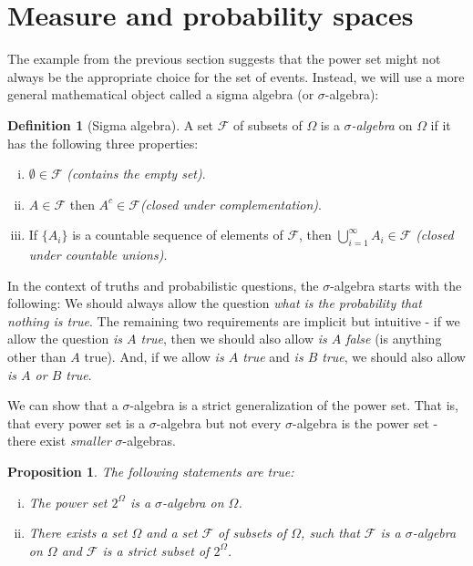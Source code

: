 \documentclass{book}
\theoremstyle{plain}%
\newtheorem{proposition}{Proposition}[section]
\theoremstyle{definition}
\newtheorem{definition}{Definition}[section]
\begin{document}
\section{Measure and probability spaces}

The example from the previous section suggests that the power set might not always be the appropriate choice for the set of events. Instead, we will use a more general mathematical object called a sigma algebra (or $\sigma$-algebra):

\begin{definition}[Sigma algebra]
A set $\mathcal{F}$ of subsets of $\Omega$ is a \emph{$\sigma$-algebra} on $\Omega$ if it has the following three properties:

\begin{enumerate}[(i)]
\item $\emptyset \in  \mathcal{F}$ \emph{(contains the empty set)}.
\item $A \in \mathcal{F}$ then $A^c \in \mathcal{F}$\emph{(closed under complementation)}.
\item If $\{A_i\}$ is a countable sequence of elements of $\mathcal{F}$,  then $\bigcup_{i=1}^\infty A_i \in \mathcal{F}$ \emph{(closed under countable unions)}.
\end{enumerate}
\end{definition}

In the context of truths and probabilistic questions, the $\sigma$-algebra starts with the following: We should always allow the question \emph{what is the probability that nothing is true}. The remaining two requirements are implicit but intuitive - if we allow the question \emph{is $A$ true}, then we should also allow \emph{is $A$ false} (is anything other than $A$ true). And, if we allow \emph{is $A$ true} and \emph{is $B$ true}, we should also allow \emph{is $A$ or $B$ true}.

We can show that a $\sigma$-algebra is a strict generalization of the power set. That is, that every power set is a $\sigma$-algebra but not every $\sigma$-algebra is the power set - there exist \emph{smaller} $\sigma$-algebras.

\begin{proposition}
The following statements are true:
\begin{enumerate}[(i)]
\item The power set $2^\Omega$ is a $\sigma$-algebra on $\Omega$.
\item There exists a set $\Omega$ and a set $\mathcal{F}$ of subsets of $\Omega$, such that $\mathcal{F}$ is a $\sigma$-algebra on $\Omega$ and $\mathcal{F}$ is a strict subset of $2^\Omega$.
\end{enumerate}
\label{prop:001a}
\end{proposition}
\end{document}

